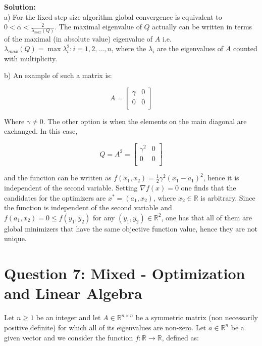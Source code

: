 \documentclass[12pt]{article}
\begin{document}
	\begin{framed}
		\textbf{Solution:}\\
		a) For the fixed step size algorithm global convergence is equivalent to $0 < \alpha < \frac{2}{\lambda_{max}(Q)}$. The maximal eigenvalue of $Q$ actually can be written in terms of the maximal (in absolute value) eigenvalue of $A$ i.e. $\lambda_{max}(Q) = \max {\lambda_i^2 : i = 1, 2, \dots , n}$, where the $\lambda_i$ are the eigenvalues of $A$ counted with multiplicity.
		
		b) An example of such a matrix is:
		
		\begin{equation}
			A = \begin{bmatrix}
				\gamma & 0 \\
				0 & 0 \\
			\end{bmatrix}
		\end{equation}
		
		Where $\gamma \neq 0$. The other option is when the elements on the main diagonal are exchanged. In this case,
		
		\begin{equation}
			Q = A^2 = \begin{bmatrix}
									\gamma^2 & 0 \\
									0 & 0 \\
								\end{bmatrix}
		\end{equation}
		
		and the function can be written as $f(x_1,x_2) = \frac{1}{2} \gamma^2 (x_1 - a_1)^2$, hence it is independent of the second variable. Setting $\nabla f(x) = 0$ one finds that the candidates for the optimizers are $x^* = (a_1,x_2)$, where $x_2 \in \mathbb{R}$ is arbitrary. Since the function is independent of the second variable and $f(a_1,x_2) = 0 \leq f(y_1,y_2)$ for any $(y_1, y_2) \in \mathbb{R}^2$, one has that all of them are global minimizers that have the same objective function value, hence they are not unique.
		
	\end{framed}
	
	\section*{Question 7: Mixed - Optimization and Linear Algebra}
	Let $n \geq 1$ be an integer and let $A \in \mathbb{R}^{n \times n}$ be a symmetric matrix (non necessarily positive definite) for which all of its eigenvalues are non-zero. Let $a \in \mathbb{R}^n$ be a given vector and we consider the function $f:\mathbb{R} \rightarrow \mathbb{R}$, defined as:
\end{document}
